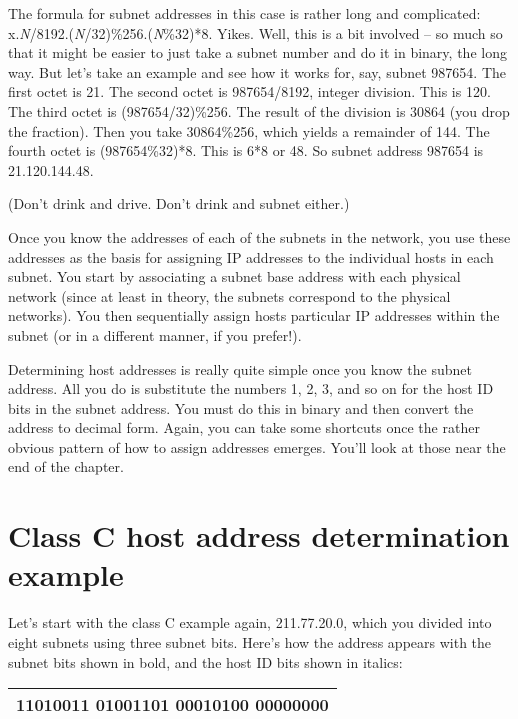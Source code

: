 The formula for subnet addresses in this case is rather long and
complicated: x.{\emph{N}}/8192.({\emph{N}}/32)\%256.({\emph{N}}\%32)*8.
Yikes. Well, this is a bit involved -- so much so that it might be easier
to just take a subnet number and do it in binary, the long way. But
let's take an example and see how it works for, say, subnet 987654. The
first octet is 21. The second octet is 987654/8192, integer division.
This is 120. The third octet is (987654/32)\%256. The result of the
division is 30864 (you drop the fraction). Then you take 30864\%256,
which yields a remainder of 144. The fourth octet is (987654\%32)*8.
This is 6*8 or 48. So subnet address 987654 is 21.120.144.48.

(Don't drink and drive. Don't drink and subnet either.)

\protect\hypertarget{ch19s05.html}{}{}

Once you know the addresses of each of the subnets in the network, you
use these addresses as the basis for assigning IP addresses to the
individual hosts in each subnet. You start by associating a subnet base
address with each physical network (since at least in theory, the
subnets correspond to the physical networks). You then sequentially
assign hosts particular IP addresses within the subnet (or in a
different manner, if you prefer!).

Determining host addresses is really quite simple once you know the
subnet address. All you do is substitute the numbers 1, 2, 3, and so on
for the host ID bits in the subnet address. You must do this in binary
and then convert the address to decimal form. Again, you can take some
shortcuts once the rather obvious pattern of how to assign addresses
emerges. You'll look at those near the end of the chapter.




\section{Class C host address determination example}

Let's start with the class C example again, 211.77.20.0, which you
divided into eight subnets using three subnet bits. Here's how the
address appears with the subnet bits shown in bold, and the host ID bits
shown in italics:

\begin{longtable}[]{@{}l@{}}
\toprule
\endhead
11010011 01001101 00010100 {\textbf{000}}{00000}\tabularnewline
\bottomrule
\end{longtable}

